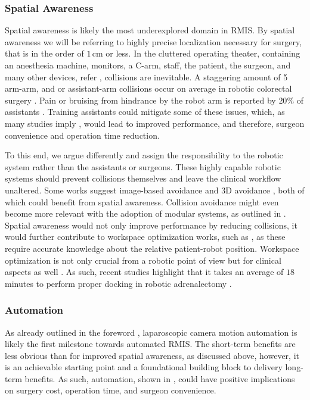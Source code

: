\subsubsection{Spatial Awareness}
\label{in:sec:spatial_awareness}
Spatial awareness is likely the most underexplored domain in RMIS. By spatial awareness we will be referring to highly precise localization necessary for surgery, that is in the order of $1\,\text{cm}$ or less. In the cluttered operating theater, containing an anesthesia machine, monitors, a C-arm, staff, the patient, the surgeon, and many other devices, refer , collisions are inevitable. A staggering amount of 5 arm-arm, and or assistant-arm collisions occur on average in robotic colorectal surgery \cite{wong2023improving}. Pain or bruising from hindrance by the robot arm is reported by $20\%$ of assistants  \cite{van2019ergonomic}. Training assistants could mitigate some of these issues, which, as many studies imply \cite{cimen2019does, mitsinikos2017does, kwon2020impact}, would lead to improved performance, and therefore, surgeon convenience and operation time reduction. 

To this end, we argue differently and assign the responsibility to the robotic system rather than the assistants or surgeons. These highly capable robotic systems should prevent collisions themselves and leave the clinical workflow unaltered. Some works suggest image-based avoidance \cite{hameed2016towards} and 3D avoidance \cite{li2023three}, both of which could benefit from spatial awareness. Collision avoidance might even become more relevant with the adoption of modular systems, as outlined in . Spatial awareness would not only improve performance by reducing collisions, it would further contribute to workspace optimization works, such as \cite{hutzl2015knowledge, zelechowski2023automatic}, as these require accurate knowledge about the relative patient-robot position. Workspace optimization is not only crucial from a robotic point of view but for clinical aspects as well \cite{alhusseinawi2023validation}. As such, recent studies highlight that it takes an average of $18$ minutes to perform proper docking in robotic adrenalectomy \cite{feng2020robot}.

\subsubsection{Automation}
\label{in:sec:automation}
As already outlined in the foreword , laparoscopic camera motion automation is likely the first milestone towards automated RMIS. The short-term benefits are less obvious than for improved spatial awareness, as discussed above, however, it is an achievable starting point and a foundational building block to delivery long-term benefits. As such, automation, shown in , could have positive implications on surgery cost, operation time, and surgeon convenience.

